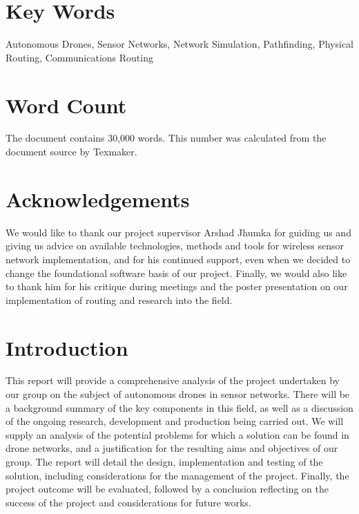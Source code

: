 \section{Key Words}
	Autonomous Drones, Sensor Networks, Network Simulation, Pathfinding, Physical Routing, Communications Routing
	\section{Word Count}
	The document contains 30,000 words. This number was calculated from the document source by Texmaker.
	\section{Acknowledgements}
	We would like to thank our project supervisor Arshad Jhumka for guiding us and giving us advice on available technologies, methods and tools for wireless sensor network implementation, and for his continued support, even when we decided to change the foundational software basis of our project. Finally, we would also like to thank him for his critique during meetings and the poster presentation on our implementation of routing and research into the field.
	\section{Introduction}
	This report will provide a comprehensive analysis of the project undertaken by our group on the subject of autonomous drones in sensor networks. There will be a background summary of the key components in this field, as well as a discussion of the ongoing research, development and production being carried out. We will supply an analysis of the potential problems for which a solution can be found in drone networks, and a justification for the resulting aims and objectives of our group. The report will detail the design, implementation and testing of the solution, including considerations for the management of the project. Finally, the project outcome will be evaluated, followed by a conclusion reflecting on the success of the project and considerations for future works.